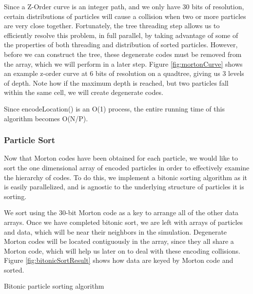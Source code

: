 \documentclass{thesis}
\begin{document}
Since a Z-Order curve is an integer path, and we only have 30 bits of resolution, certain distributions of particles will cause a collision when two or more particles are very close together. Fortunately, the tree threading step allows us to efficiently resolve this problem, in full parallel, by taking advantage of some of the properties of both threading and distribution of sorted particles. However, before we can construct the tree, these degenerate codes must be removed from the array, which we will perform in a later step. Figure \ref{fig:mortonCurve} shows an example z-order curve at 6 bits of resolution on a quadtree, giving us 3 levels of depth. Note how if the maximum depth is reached, but two particles fall within the same cell, we will create degenerate codes.

Since encodeLocation() is an O(1) process, the entire running time of this algorithm becomes O(N/P).


\subsubsection{Particle Sort}
Now that  Morton codes have been obtained for each particle, we would like to sort the one dimensional array of encoded particles in order to effectively examine the hierarchy of codes. To do this, we implement a bitonic sorting algorithm as it is easily parallelized, and is agnostic to the underlying structure of particles it is sorting.

We sort using the 30-bit  Morton code as a key to arrange all of the other data arrays. Once we have completed bitonic sort, we are left with arrays of particles and data, which will be near their neighbors in the simulation. Degenerate  Morton codes will be located contiguously in the array, since they all share a  Morton code, which will help us later on to deal with these encoding collisions. Figure \ref{fig:bitonicSortResult} shows how data are keyed by  Morton code and sorted.

\begin{algorithm}
    \label{alg:BitonicParticleSort}
    \caption{Bitonic particle sorting algorithm}
    \begin{algorithmic}
        \EndFor
    \end{algorithmic}
\end{algorithm}
\end{document}
